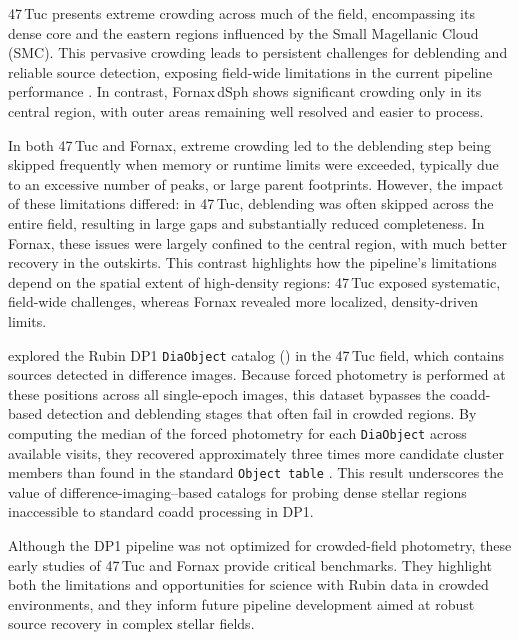 47\,Tuc presents extreme crowding across much of the field, encompassing its dense core and the eastern regions influenced by the Small Magellanic Cloud (SMC). 
This pervasive crowding leads to persistent challenges for deblending and reliable source detection, exposing field-wide limitations in the current pipeline performance \citep{Choi2025}.
In contrast, Fornax\,dSph shows significant crowding only in its central region, with outer areas remaining well resolved and easier to process. 

In both 47\,Tuc and Fornax, extreme crowding led to the deblending step being skipped frequently when memory or runtime limits were exceeded, typically due to an excessive number of peaks, or large parent footprints.
However, the impact of these limitations differed: in 47\,Tuc, deblending was often skipped across the entire field, resulting in large gaps and substantially reduced completeness. 
In Fornax, these issues were largely confined to the central region, with much better recovery in the outskirts. 
This contrast highlights how the pipeline’s limitations depend on the spatial extent of high-density regions: 47\,Tuc exposed systematic, field-wide challenges, whereas Fornax revealed more localized, density-driven limits.

\citet{Wainer2025} explored the Rubin DP1 \texttt{DiaObject} catalog () in the 47\,Tuc field, which contains sources detected in difference images. 
Because forced photometry is performed at these positions across all single-epoch images, this dataset bypasses the coadd-based detection and deblending stages that often fail in crowded regions. 
By computing the median of the forced photometry for each  \texttt{DiaObject} across available visits, they recovered approximately three times more candidate cluster members than found in the standard \texttt{Object table} \citep{Choi2025}. 
This result underscores the value of difference-imaging–based catalogs for probing dense stellar regions inaccessible to standard coadd processing in DP1.

Although the DP1 pipeline was not optimized for crowded-field photometry, these early studies of 47\,Tuc and Fornax provide critical benchmarks. 
They highlight both the limitations and opportunities for science with Rubin data in crowded environments, and they inform future pipeline development aimed at robust source recovery in complex stellar fields.
